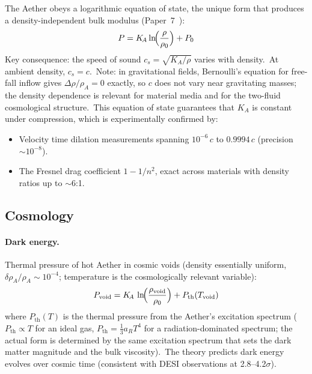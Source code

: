 ﻿\documentclass[12pt,letterpaper]{article}
\newcommand{\rhoa}{\rho_{\!A}}
\newcommand{\Ka}{K_{\!A}}
\begin{document}
The Aether obeys a logarithmic equation of state, the unique form that produces
a density-independent bulk modulus (Paper~7~\cite{otto-quantum}):
%
\begin{equation}
  P = \Ka \ln\!\Bigl(\frac{\rho}{\rho_0}\Bigr) + P_0
  \label{eq:sum-eos}
\end{equation}
%
Key consequence: the speed of sound $c_s = \sqrt{\Ka/\rho}$ varies with
density.\ At ambient density, $c_s = c$.\ Note: in gravitational fields,
Bernoulli's equation for free-fall inflow gives $\Delta\rho/\rhoa = 0$
exactly, so $c$ does not vary near gravitating masses; the density
dependence is relevant for material media and for the two-fluid
cosmological structure.\ This equation of state guarantees that $\Ka$ is
constant under compression, which is experimentally confirmed by:
%
\begin{itemize}[leftmargin=2em]
  \item Velocity time dilation measurements spanning $10^{-6}\,c$ to $0.9994\,c$
    (precision $\sim 10^{-8}$).
  \item The Fresnel drag coefficient $1 - 1/n^2$, exact across materials with
    density ratios up to $\sim$6:1.
\end{itemize}


\subsection{Cosmology}

\paragraph{Dark energy.}
Thermal pressure of hot Aether in cosmic voids (density essentially uniform,
$\delta\rhoa/\rhoa \sim 10^{-4}$; temperature is the cosmologically relevant variable):
%
\begin{equation}
  P_{\mathrm{void}} = \Ka\,\ln\!\Bigl(\frac{\rho_{\mathrm{void}}}{\rho_0}\Bigr)
    + P_{\mathrm{th}}(T_{\mathrm{void}})
  \label{eq:sum-dark-energy}
\end{equation}
%
where $P_{\mathrm{th}}(T)$ is the thermal pressure from the Aether's
excitation spectrum ($P_{\mathrm{th}} \propto T$ for an ideal gas,
$P_{\mathrm{th}} = \frac{1}{3}a_R T^4$ for a radiation-dominated spectrum;
the actual form is determined by the same excitation spectrum that sets
the dark matter magnitude and the bulk viscosity).\ The theory predicts dark
energy evolves over cosmic time (consistent with DESI observations at
2.8--4.2$\sigma$).
\end{document}
